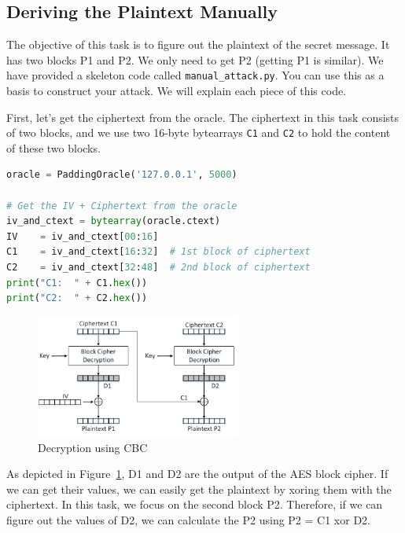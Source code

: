 \subsection{Deriving the Plaintext Manually} 


The objective of this task is to figure out the plaintext 
of the secret message. It has two blocks P1 and P2. 
We only need to get P2 (getting P1 is similar). 
We have provided a skeleton code called \texttt{manual\_attack.py}. 
You can use this as a basis to construct your attack. We 
will explain each piece of this code. 


First, let's get the ciphertext from the oracle. 
The ciphertext in this task consists of two blocks, and 
we use two 16-byte bytearrays \texttt{C1} and \texttt{C2}
to hold the content of these two blocks.

\begin{lstlisting}[language=python]
oracle = PaddingOracle('127.0.0.1', 5000)

# Get the IV + Ciphertext from the oracle
iv_and_ctext = bytearray(oracle.ctext)
IV    = iv_and_ctext[00:16]
C1    = iv_and_ctext[16:32]  # 1st block of ciphertext
C2    = iv_and_ctext[32:48]  # 2nd block of ciphertext
print("C1:  " + C1.hex())
print("C2:  " + C2.hex())
\end{lstlisting}


\begin{figure}[htb]
  \begin{center}
    \includegraphics[width=0.6\textwidth]{Figs/cbc-dec.pdf}
  \end{center}
  \caption{Decryption using CBC}
  \label{fig:cbc-dec}
\end{figure}
 
 
As depicted in Figure~\ref{fig:cbc-dec}, D1 and D2 are the 
output of the AES block cipher. If we can 
get their values, we can easily get the plaintext
by xoring them with the ciphertext. In this task,
we focus on the second block P2. Therefore, if we can
figure out the values of D2, 
we can calculate the P2 using P2 = C1 xor D2.


